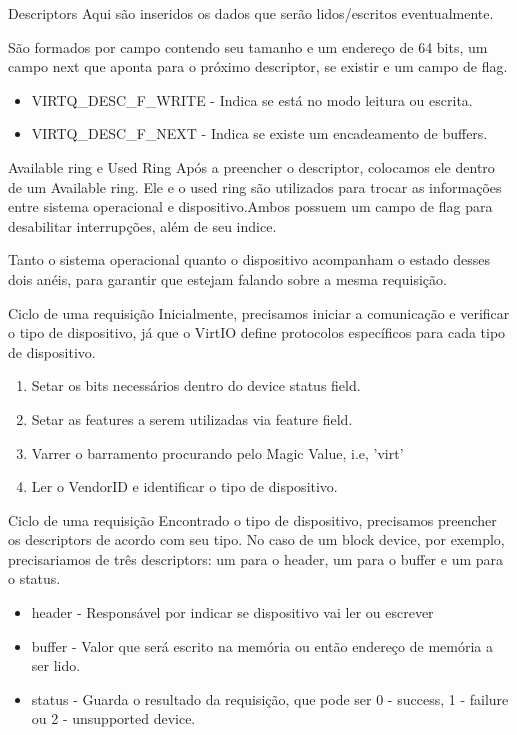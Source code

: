\documentclass[brazil,nolapesd,aspectratio=169,noartschool]{lapesd-slides}
\begin{document}
\begin{frame}{Descriptors}
  Aqui são inseridos os dados que serão lidos/escritos eventualmente.

  São formados por campo contendo seu tamanho e um endereço de 64 bits, um campo next que aponta
  para o próximo descriptor, se existir e um campo de flag.

  \begin{itemize}
    \item VIRTQ{\_}DESC{\_}F{\_}WRITE - Indica se está no modo leitura ou escrita.
    \item VIRTQ{\_}DESC{\_}F{\_}NEXT - Indica se existe um encadeamento de buffers.
  \end{itemize}
\end{frame}

\begin{frame}{Available ring e Used Ring}
  Após a preencher o descriptor, colocamos ele dentro de um Available ring. Ele e o used ring são utilizados
  para trocar as informações entre sistema operacional e dispositivo.Ambos possuem um campo de flag para desabilitar interrupções, além de seu indice.


  Tanto o sistema operacional quanto o dispositivo acompanham o estado desses dois anéis, para garantir que estejam falando sobre a mesma requisição.
\end{frame}

\begin{frame}{Ciclo de uma requisição}
  Inicialmente, precisamos iniciar a comunicação e verificar o tipo de dispositivo, já que o VirtIO define protocolos específicos para cada tipo de dispositivo.


  \begin{enumerate}
    \item Setar os bits necessários dentro do device status field.
    \item Setar as features a serem utilizadas via feature field.
    \item Varrer o barramento procurando pelo Magic Value, i.e, 'virt'
    \item Ler o VendorID e identificar o tipo de dispositivo.
  \end{enumerate}
\end{frame}

\begin{frame}{Ciclo de uma requisição}
Encontrado o tipo de dispositivo, precisamos preencher os descriptors de acordo com seu tipo. No caso de um block device, por exemplo,
precisariamos de três descriptors: um para o header, um para o buffer e um para o status.

\begin{itemize}
  \item header - Responsável por indicar se dispositivo vai ler ou escrever
  \item buffer - Valor que será escrito na memória ou então endereço de memória a ser lido.
  \item status - Guarda o resultado da requisição, que pode ser 0 - success, 1 - failure ou 2 - unsupported device.
\end{itemize}
\end{frame}
\end{document}
